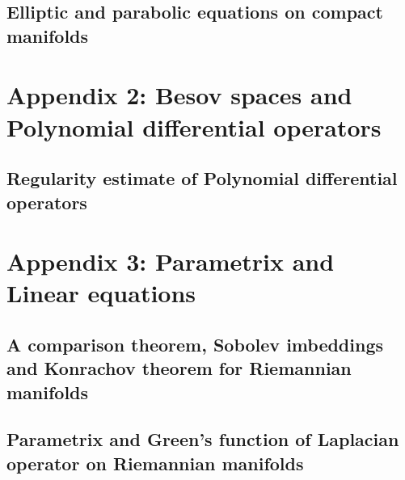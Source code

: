 \documentclass[12pt]{book}
\begin{document}
\chapter{Elliptic and parabolic equations on compact manifolds}


\part{Appendix 2: Besov spaces and Polynomial differential operators}
\chapter{Regularity estimate of Polynomial differential operators}


\part{Appendix 3: Parametrix and Linear equations}
\chapter[Sobolev spaces on Riemannian manifolds]{A comparison theorem, Sobolev imbeddings and Konrachov theorem for Riemannian manifolds}


\chapter[Parametrix and Green's function]{Parametrix and Green's function of Laplacian operator on Riemannian manifolds }




\end{document}
